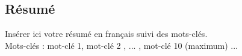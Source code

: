 \begin{vcenterpage}

\chapter*{Résumé}
\adjustmtc
{}

Insérer ici votre résumé en français suivi des mots-clés.\\

Mots-clés : mot-clé 1, mot-clé 2 , ... , mot-clé 10 (maximum) ...


\end{vcenterpage}